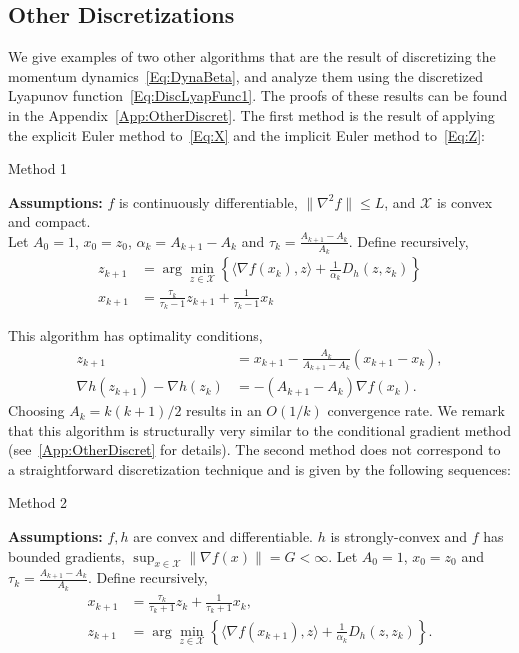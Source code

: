 \documentclass[11pt]{article}
\theoremstyle{plain}
\newcommand{\X}{{\mathcal X}}
\begin{document}
\subsection{Other Discretizations}
We give examples of two other algorithms that are the result of discretizing the momentum dynamics~\eqref{Eq:DynaBeta}, and analyze them using the discretized Lyapunov function~\eqref{Eq:DiscLyapFunc1}. The proofs of these results can be found in the Appendix~\ref{App:OtherDiscret}. The first method is the result of applying the explicit Euler method to~\eqref{Eq:X} and the implicit Euler method to~\eqref{Eq:Z}:
\begin{algorithm}[H]
\caption{Method 1}
{\bf Assumptions:} $f$ is continuously differentiable, $\|\nabla^2 f\|\leq L$, and $\X$ is convex and compact. \\
Let $A_0 = 1$, $x_0 = z_0$, $\alpha_k = A_{k+1} - A_k$ and $\tau_k = \frac{A_{k+1}- A_k}{A_{k}}$. Define recursively,
\begin{subequations}\label{Eq:QuasiSub2}
\begin{align}
z_{k+1} &= \arg \min_{z \in \X} \left\{\langle \nabla f(x_k),z \rangle + \frac{1}{\alpha_k} D_h(z, z_k)\right\}\\
x_{k+1} &= \frac{\tau_k}{\tau_k - 1}z_{k+1} + \frac{1}{\tau_k - 1}  x_k
\end{align} 
\end{subequations}
\end{algorithm}
\noindent This algorithm has optimality conditions,
\begin{subequations}
\begin{align}
z_{k+1} &= x_{k+1} - \frac{A_{k}}{A_{k+1} -A_{k}} (x_{k+1} - x_k),\label{Eq:ZSeqOther1}\\
\nabla h(z_{k+1}) -\nabla h(z_k) &= -(A_{k+1} - A_{k})\nabla f(x_{k}) \label{Eq:XSeqOther1}.
\end{align}
\end{subequations}
\noindent Choosing $A_k = k(k+1)/2$ results in an $O(1/k)$ convergence rate. We remark that  this algorithm is structurally very similar to the conditional gradient method (see~\ref{App:OtherDiscret} for details). The second method does not correspond to a straightforward discretization technique and is given by the following sequences:
\begin{algorithm}[H]
\caption{Method 2}
{\bf Assumptions:} $f, h$ are convex and differentiable. $h$ is strongly-convex and $f$ has bounded gradients, $\sup_{x\in\X}\|\nabla f(x)\| = G <\infty$. 
Let $A_0 = 1$, $x_0 = z_0$ and $\tau_k = \frac{A_{k+1}- A_k}{A_{k}}$. Define recursively,
\begin{subequations}\label{Eq:QuasiSub3}
\begin{align}
x_{k+1}  &= \frac{\tau_k}{\tau_k + 1} z_k + \frac{1}{\tau_k+1}x_k,\\%
z_{k+1} &= \arg \min_{z \in \X} \left\{\langle \nabla f(x_{k+1}),z\rangle + \frac{1}{\alpha_k} D_h(z, z_k)\right\}.
\end{align} 
\end{subequations}
\end{algorithm}
\end{document}
